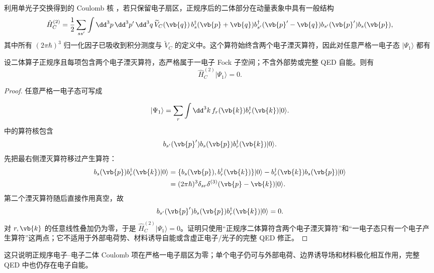 利用单光子交换得到的 Coulomb 核 ，若只保留电子扇区，正规序后的二体部分在动量表象中具有一般结构
\begin{equation}
 \hat H_C^{(2)}
 =\frac12\sum_{ss'}\int\dd^3 p\,\dd^3 p'\,\dd^3 q\,
 \widetilde V_C(\vb{q})\,
 b_s^\dagger(\vb{p}+\vb{q})
 b_{s'}^\dagger(\vb{p}'-\vb{q})
 b_{s'}(\vb{p}')b_s(\vb{p}),
 \label{eq:coulomb-two-body-momentum-r2}
\end{equation}
其中所有 $(2\pi\hbar)^3$ 归一化因子已吸收到积分测度与 $\widetilde V_C$ 的定义中。这个算符始终含两个电子湮灭算符，因此对任意严格一电子态 $|\Psi_1\rangle$ 都有


\begin{proposition}[正规序二体算子在一粒子空间上为零]
设二体算子正规序且每项包含两个电子湮灭算符，态严格属于一电子 Fock 子空间；不含外部势或完整 QED 自能。则有
\begin{equation}
 {\hat H_C^{(2)}|\Psi_1\rangle=0.}
\label{eq:one-electron-coulomb-zero-r2}
\end{equation}
\end{proposition}
\begin{proof}
任意严格一电子态可写成

\begin{equation*}
 |\Psi_1\rangle
 =\sum_r\int\dd^3 k\,f_r(\vb{k})
 b_r^\dagger(\vb{k})|0\rangle.
\end{equation*}
 中的算符核包含
\begin{equation*}
 b_{s'}(\vb{p}')b_s(\vb{p})b_r^\dagger(\vb{k})|0\rangle.
\end{equation*}
先把最右侧湮灭算符移过产生算符：
\begin{align*}
 b_s(\vb{p})b_r^\dagger(\vb{k})|0\rangle
 &=\{b_s(\vb{p}),b_r^\dagger(\vb{k})\}|0\rangle
 -b_r^\dagger(\vb{k})b_s(\vb{p})|0\rangle\\
 &=(2\pi\hbar)^3\delta_{sr}\delta^{(3)}(\vb{p}-\vb{k})|0\rangle.
\end{align*}
第二个湮灭算符随后直接作用真空，故
\begin{equation*}
 b_{s'}(\vb{p}')b_s(\vb{p})b_r^\dagger(\vb{k})|0\rangle=0.
\end{equation*}
对 $r,\vb{k}$ 的任意线性叠加仍为零，于是 $\hat H_C^{(2)}|\Psi_1\rangle=0$。证明只使用“正规序二体算符含两个电子湮灭算符”和“一电子态只有一个电子产生算符”这两点；它不适用于外部电荷势、材料诱导自能或含虚正电子/光子的完整 QED 修正。
\end{proof}

这只说明正规序电子--电子二体 Coulomb 项在严格一电子扇区为零；单个电子仍可与外部电荷、边界诱导场和材料极化相互作用，完整 QED 中也仍存在电子自能。

